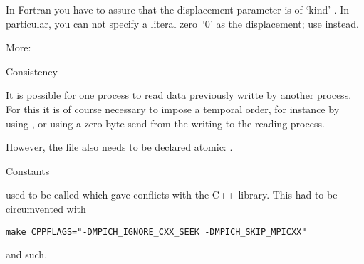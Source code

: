\begin{fortrannote}
  In Fortran you have to assure that the displacement parameter is of
  `kind' . In particular, you can not
  specify a literal zero~`0' as the displacement; use
   instead.
\end{fortrannote}

More:

 {Consistency}

It is possible for one process to read data previously writte by another process.
For this it is of course necessary to impose a temporal order,
for instance by using ,
or using a zero-byte send from the writing to the reading process.

However, the file also needs to be declared atomic:
.

 {Constants}

 used to be called 
which gave conflicts with the C++ library. This had to be circumvented
with
\begin{verbatim}
make CPPFLAGS="-DMPICH_IGNORE_CXX_SEEK -DMPICH_SKIP_MPICXX"
\end{verbatim}
and such.

